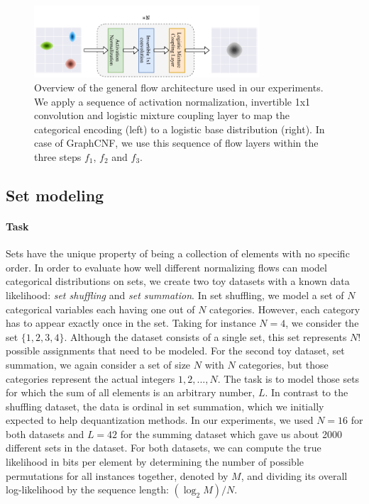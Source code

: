\begin{figure}[ht!]
    \centering
    \includegraphics[width=0.75\textwidth]{figures/experiments_figures/flow_template_overview.pdf}
    \caption[Flow architecture in experiments]{Overview of the general flow architecture used in our experiments. We apply a sequence of activation normalization, invertible 1x1 convolution and logistic mixture coupling layer to map the categorical encoding (left) to a logistic base distribution (right). In case of GraphCNF, we use this sequence of flow layers within the three steps $f_1$, $f_2$ and $f_3$.}
    \label{fig:experiments_flow_template_overview}
\end{figure}


\subsection{Set modeling}
\label{sec:experiments_set_modeling}

\paragraph{Task} Sets have the unique property of being a collection of elements with no specific order. 
In order to evaluate how well different normalizing flows can model categorical distributions on sets, we create two toy datasets with a known data likelihood:  \textit{set shuffling} and \textit{set summation}. 
In set shuffling, we model a set of $N$ categorical variables each having one out of $N$ categories. 
However, each category has to appear exactly once in the set. 
Taking for instance $N=4$, we consider the set $\{1,2,3,4\}$.
Although the dataset consists of a single set, this set represents $N!$ possible assignments that need to be modeled. 
For the second toy dataset, set summation, we again consider a set of size $N$ with $N$ categories, but those categories represent the actual integers $1,2,...,N$. 
The task is to model those sets for which the sum of all elements is an arbitrary number, $L$. 
In contrast to the shuffling dataset, the data is ordinal in set summation, which we initially expected to help dequantization methods. 
In our experiments, we used $N=16$ for both datasets and $L=42$ for the summing dataset which gave us about 2000 different sets in the dataset.
For both datasets, we can compute the true likelihood in bits per element by determining the number of possible permutations for all instances together, denoted by $M$, and dividing its overall log-likelihood by the sequence length: $(\log_2 M)/N$. 

